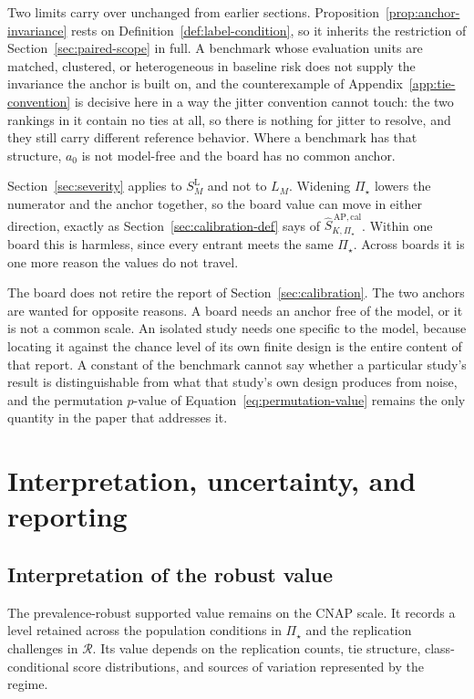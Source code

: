 \documentclass[11pt]{article}
\newcommand{\Regime}{\mathcal{R}}
\newcommand{\PSet}{\Pi_\star}
\newcommand{\SRobCalHat}{\widehat S_{K,\PSet}^{\,\mathrm{AP,cal}}}
\newcommand{\SLead}{S^{\mathrm{L}}}
\theoremstyle{remark}
\begin{document}
Two limits carry over unchanged from earlier sections. Proposition~\ref{prop:anchor-invariance} rests on Definition~\ref{def:label-condition}, so it inherits the restriction of Section~\ref{sec:paired-scope} in full. A benchmark whose evaluation units are matched, clustered, or heterogeneous in baseline risk does not supply the invariance the anchor is built on, and the counterexample of Appendix~\ref{app:tie-convention} is decisive here in a way the jitter convention cannot touch: the two rankings in it contain no ties at all, so there is nothing for jitter to resolve, and they still carry different reference behavior. Where a benchmark has that structure, $a_0$ is not model-free and the board has no common anchor.

Section~\ref{sec:severity} applies to $\SLead_M$ and not to $L_M$. Widening $\PSet$ lowers the numerator and the anchor together, so the board value can move in either direction, exactly as Section~\ref{sec:calibration-def} says of $\SRobCalHat$. Within one board this is harmless, since every entrant meets the same $\PSet$. Across boards it is one more reason the values do not travel.

The board does not retire the report of Section~\ref{sec:calibration}. The two anchors are wanted for opposite reasons. A board needs an anchor free of the model, or it is not a common scale. An isolated study needs one specific to the model, because locating it against the chance level of its own finite design is the entire content of that report. A constant of the benchmark cannot say whether a particular study's result is distinguishable from what that study's own design produces from noise, and the permutation $p$-value of Equation~\eqref{eq:permutation-value} remains the only quantity in the paper that addresses it.

\section{Interpretation, uncertainty, and reporting}
\label{sec:reporting}

\subsection{Interpretation of the robust value}

The prevalence-robust supported value remains on the CNAP scale. It records a level retained across the population conditions in $\PSet$ and the replication challenges in $\Regime$. Its value depends on the replication counts, tie structure, class-conditional score distributions, and sources of variation represented by the regime.
\end{document}
